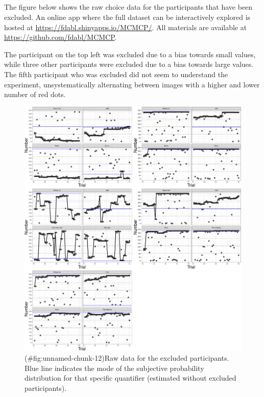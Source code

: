 \begin{appendix}
\section{}
The figure below shows the raw choice data for the participants that
have been excluded. An online app where the full dataset can be
interactively explored is hosted at
\mbox{\href{https://fdabl.shinyapps.io/MCMCP/}{https://fdabl.shinyapps.io/MCMCP/}}.
All materials are available at
\mbox{\href{https://github.com/fdabl/MCMCP}{https://github.com/fdabl/MCMCP}}.

The participant on the top left was excluded due to a bias towards small
values, while three other participants were excluded due to a bias
towards large values. The fifth participant who was excluded did not
seem to understand the experiment, unsystematically alternating between
images with a higher and lower number of red dots.

\begin{figure}
\centering
\includegraphics{manuscript_files/figure-latex/unnamed-chunk-12-1.pdf}
\caption{(\#fig:unnamed-chunk-12)Raw data for the excluded participants.
Blue line indicates the mode of the subjective probability distribution
for that specific quantifier (estimated without excluded participants).}
\end{figure}

\hypertarget{refs}{}
\end{appendix}
